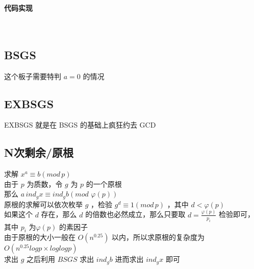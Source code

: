 	\paragraph{代码实现}~\\
	
	
	\newpage
	\subsection{BSGS}
	这个板子需要特判 $a=0$ 的情况\\
	
	\newpage
	\subsection{EXBSGS}
	EXBSGS 就是在 BSGS 的基础上疯狂约去 GCD\\
	
	\newpage
	\subsection{N次剩余/原根}
	求解 $x^a\equiv b(mod\,p)$\\
	由于 $p$ 为质数，令 $g$ 为 $p$ 的一个原根\\
	那么 $a\,ind_gx\equiv ind_gb(mod\,\,\varphi(p))$\\
	原根的求解可以依次枚举 $g$ ，检验 $g^d\equiv 1(mod\,p)$ ，其中 $d<\varphi(p)$\\
	如果这个 $d$ 存在，那么 $d$ 的倍数也必然成立，那么只要取 $d=\frac{\varphi(p)}{p_i}$ 检验即可，其中 $p_i$ 为$\varphi(p)$ 的素因子\\
	由于原根的大小一般在 $O(n^{0.25})$ 以内，所以求原根的复杂度为 $O(n^{0.25}logp\times loglogp)$\\
	求出 $g$ 之后利用 $BSGS$ 求出 $ind_gb$ 进而求出 $ind_gx$ 即可\\
	
	\newpage
